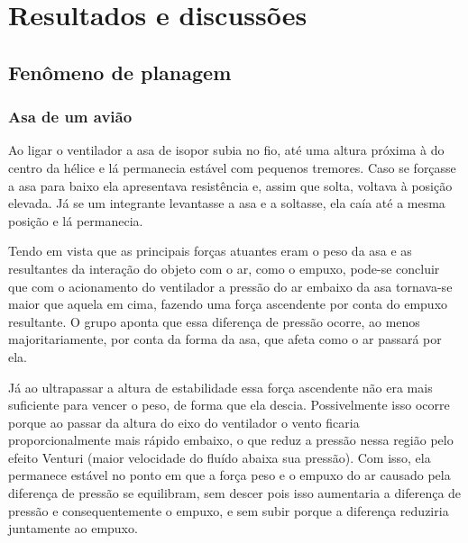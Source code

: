 \section{Resultados e discussões}

\subsection{Fenômeno de planagem}
\subsubsection{Asa de um avião}
    Ao ligar o ventilador a asa de isopor subia no fio, até uma altura próxima à do
    centro da hélice e lá permanecia estável com pequenos tremores. Caso se forçasse
    a asa para baixo ela apresentava resistência e, assim que solta, voltava à
    posição elevada. Já se um integrante levantasse a asa e a soltasse, ela caía até
    a mesma posição e lá permanecia.

    Tendo em vista que as principais forças atuantes eram o peso da asa e as
    resultantes da interação do objeto com o ar, como o empuxo, pode-se concluir que
    com o acionamento do ventilador a pressão do ar embaixo da asa tornava-se maior
    que aquela em cima, fazendo uma força ascendente por conta do empuxo resultante.
    O grupo aponta que essa diferença de pressão ocorre, ao menos majoritariamente,
    por conta da forma da asa, que afeta como o ar passará por ela.

    Já ao ultrapassar a altura de estabilidade essa força ascendente não era mais
    suficiente para vencer o peso, de forma que ela descia. Possivelmente isso
    ocorre porque ao passar da altura do eixo do ventilador o vento ficaria
    proporcionalmente mais rápido embaixo, o que reduz a pressão nessa região pelo
    efeito Venturi (maior velocidade do fluído abaixa sua pressão). Com isso, ela
    permanece estável no ponto em que a força peso e o empuxo do ar causado pela
    diferença de pressão se equilibram, sem descer pois isso aumentaria a diferença
    de pressão e consequentemente o empuxo, e sem subir porque a diferença reduziria
    juntamente ao empuxo. 

